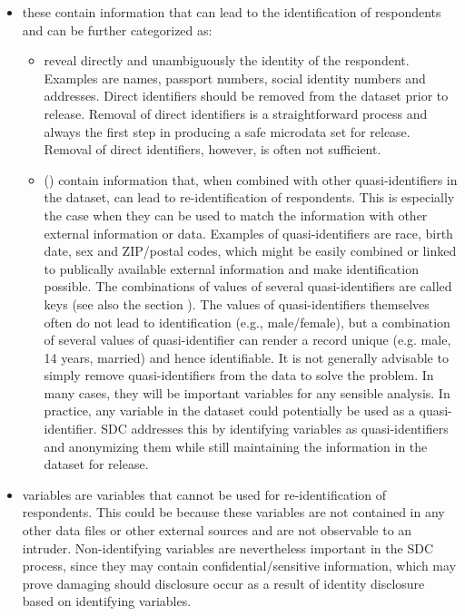 \documentclass[letterpaper,10pt,english]{sphinxmanual}
\begin{document}
\begin{itemize}
\item {} 
 these contain information that can lead to
the identification of respondents and can be further categorized as:
\begin{itemize}
\item {} 
 reveal directly and unambiguously the
identity of the respondent. Examples are names, passport numbers,
social identity numbers and addresses. Direct identifiers should
be removed from the dataset prior to release. Removal of direct
identifiers is a straightforward process and always the first step
in producing a safe microdata set for release. Removal of direct
identifiers, however, is often not sufficient.

\item {} 
 () contain information
that, when combined with other quasi-identifiers in the dataset,
can lead to re-identification of respondents. This is especially
the case when they can be used to match the information with other
external information or data. Examples of quasi-identifiers are
race, birth date, sex and ZIP/postal codes, which might be easily
combined or linked to publically available external information
and make identification possible. The combinations of values of
several quasi-identifiers are called keys (see also the section {\hyperref[\detokenize{measure_risk:levels-of-risk}]{}}).
The values of quasi-identifiers themselves often do not lead to
identification (e.g., male/female), but a combination of several
values of quasi-identifier can render a record unique (e.g. male,
14 years, married) and hence identifiable. It is not generally
advisable to simply remove quasi-identifiers from the data to
solve the problem. In many cases, they will be important variables
for any sensible analysis. In practice, any variable in the
dataset could potentially be used as a quasi-identifier. SDC
addresses this by identifying variables as quasi-identifiers and
anonymizing them while still maintaining the information in the
dataset for release.

\end{itemize}

\item {} 
 variables are variables that cannot be used for
re-identification of respondents. This could be because these
variables are not contained in any other data files or other external
sources and are not observable to an intruder. Non-identifying
variables are nevertheless important in the SDC process, since they
may contain confidential/sensitive information, which may prove
damaging should disclosure occur as a result of identity disclosure
based on identifying variables.

\end{itemize}
\end{document}
